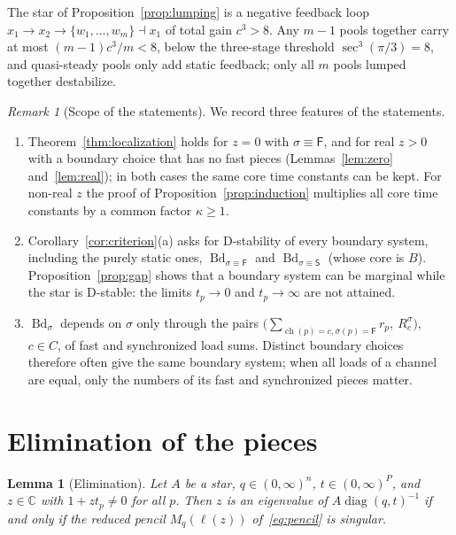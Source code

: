 \documentclass[11pt,a4paper]{article}
\theoremstyle{plain}
\newtheorem{lemma}[theorem]{Lemma}
\theoremstyle{definition}
\theoremstyle{remark}
\newtheorem{remark}[theorem]{Remark}
\newcommand{\C}{\mathbb{C}}
\newcommand{\diag}{\operatorname{diag}}
\newcommand{\Bd}{\operatorname{Bd}}
\newcommand{\ch}{\operatorname{ch}}
\newcommand{\rF}{\mathsf{F}}
\newcommand{\rS}{\mathsf{S}}
\begin{document}
The star of Proposition~\ref{prop:lumping} is a negative feedback loop
$x_1\to x_2\to\{w_1,\dots,w_m\}\dashv x_1$ of total gain $c^3>8$. Any $m-1$ pools together
carry at most $(m-1)c^3/m<8$, below the three-stage threshold $\sec^3(\pi/3)=8$, and
quasi-steady pools only add static feedback; only all $m$ pools lumped together destabilize.

\begin{remark}[Scope of the statements]\label{rem:scope}
We record three features of the statements.
\begin{enumerate}[label=(\roman*)]
  \item Theorem~\ref{thm:localization} holds for $z=0$ with $\sigma\equiv\rF$, and for
    real $z>0$ with a boundary choice that has no fast pieces
    (Lemmas~\ref{lem:zero} and~\ref{lem:real}); in both cases the same core time constants
    can be kept. For non-real $z$ the proof of Proposition~\ref{prop:induction} multiplies all
    core time constants by a common factor $\kappa\ge1$.
  \item Corollary~\ref{cor:criterion}(a) asks for D-stability of every boundary system,
    including the purely static ones, $\Bd_{\sigma\equiv\rF}$ and $\Bd_{\sigma\equiv\rS}$
    (whose core is $B$). Proposition~\ref{prop:gap} shows that a boundary system can be
    marginal while the star is D-stable: the limits $t_p\to0$ and $t_p\to\infty$ are not
    attained.
  \item $\Bd_\sigma$ depends on $\sigma$ only through the pairs
    $\bigl(\sum_{\ch(p)=c,\sigma(p)=\rF}r_p,\ R^\sigma_c\bigr)$, $c\in C$, of fast and
    synchronized load sums. Distinct boundary choices therefore often give the same boundary
    system; when all loads of a channel are equal, only the numbers of its fast and
    synchronized pieces matter.
\end{enumerate}
\end{remark}

\section{Elimination of the pieces}\label{sec:elimination}

\begin{lemma}[Elimination]\label{lem:elimination}
Let $A$ be a star, $q\in(0,\infty)^n$, $t\in(0,\infty)^P$, and $z\in\C$ with $1+zt_p\ne0$
for all $p$. Then $z$ is an eigenvalue of $A\diag(q,t)^{-1}$ if and only if the reduced
pencil $M_q(\ell(z))$ of~\eqref{eq:pencil} is singular.
\end{lemma}
\end{document}
